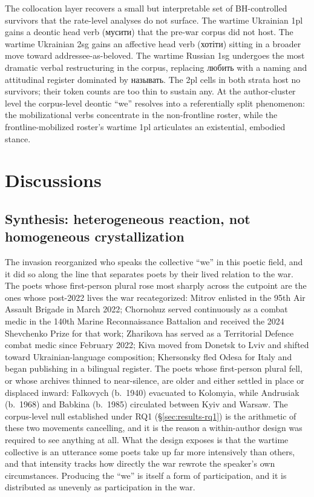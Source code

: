 \documentclass[12pt]{interact}
\theoremstyle{plain}%
\theoremstyle{definition}
\theoremstyle{remark}
\begin{document}
The collocation layer recovers a small but interpretable set of BH-controlled survivors that the rate-level analyses do not surface. The wartime Ukrainian 1pl gains a deontic head verb (\textukrainian{мусити}) that the pre-war corpus did not host. The wartime Ukrainian 2sg gains an affective head verb (\textukrainian{хотіти}) sitting in a broader move toward addressee-as-beloved. The wartime Russian 1sg undergoes the most dramatic verbal restructuring in the corpus, replacing \textukrainian{любить} with a naming and attitudinal register dominated by \textukrainian{называть}. The 2pl cells in both strata host no survivors; their token counts are too thin to sustain any. At the author-cluster level the corpus-level deontic ``we'' resolves into a referentially split phenomenon: the mobilizational verbs concentrate in the non-frontline roster, while the frontline-mobilized roster's wartime 1pl articulates an existential, embodied stance.

\section{Discussions}

\subsection{Synthesis: heterogeneous reaction, not homogeneous crystallization}
\label{sec:discussion-synthesis}

The invasion reorganized who speaks the collective ``we'' in this poetic field, and it did so along the line that separates poets by their lived relation to the war. The poets whose first-person plural rose most sharply across the cutpoint are the ones whose post-2022 lives the war recategorized: Mitrov enlisted in the 95th Air Assault Brigade in March 2022; Chornohuz served continuously as a combat medic in the 140th Marine Reconnaissance Battalion and received the 2024 Shevchenko Prize for that work; Zharikova has served as a Territorial Defence combat medic since February 2022; Kiva moved from Donetsk to Lviv and shifted toward Ukrainian-language composition; Khersonsky fled Odesa for Italy and began publishing in a bilingual register. The poets whose first-person plural fell, or whose archives thinned to near-silence, are older and either settled in place or displaced inward: Falkovych (b.~1940) evacuated to Kolomyia, while Andrusiak (b.~1968) and Babkina (b.~1985) circulated between Kyiv and Warsaw. The corpus-level null established under RQ1 (\S\ref{sec:results-rq1}) is the arithmetic of these two movements cancelling, and it is the reason a within-author design was required to see anything at all. What the design exposes is that the wartime collective is an utterance some poets take up far more intensively than others, and that intensity tracks how directly the war rewrote the speaker's own circumstances. Producing the ``we'' is itself a form of participation, and it is distributed as unevenly as participation in the war.
\end{document}
